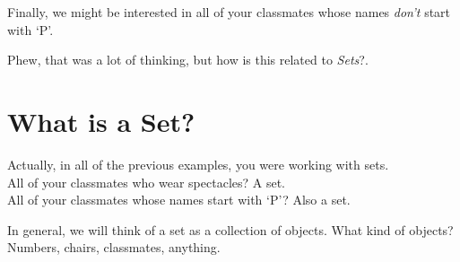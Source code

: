 \documentclass{article}
\def\firstcircle{(0.75,0) circle (1)}
\def\specs{(0.75, 1) node [text=black, above left] {Wear spectacles}}
\def\secondcircle{(1.75, 0) circle (1)}
\def\name{(1.75, -1) node [text=black, below right] {Name starts with `P'}}
\def\rectangle{(-2, -2) rectangle (4.5, 2) (1, 2) node [text=black, above] {classmates}}
\begin{document}
\vspace{1em}

Finally, we might be interested in all of your classmates whose names \emph{don't}
start with `P'.

\vspace{1em}


\vspace{1em}

Phew, that was a lot of thinking, but how is this related to \emph{Sets}?.

\section{What is a Set?}



Actually, in all of the previous examples, you were working with sets. \\
All of your classmates who wear spectacles? A set. \\ 
All of your classmates whose names start with `P'? Also a set.

\vspace{1em}

%
%
%

In general, 
we will think of a set as a collection of objects.
What kind of objects? Numbers, chairs, classmates, anything.
\end{document}
